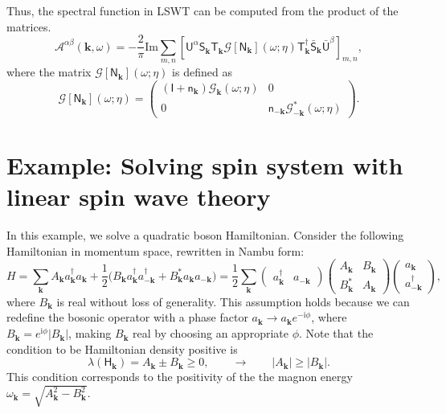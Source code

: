 \documentclass[aps, prx, nofootinbib, superscriptaddress]{revtex4-2}
\newcommand{\kvec}{\mathbf{k}}
\newcommand{\ri}{\mathrm{i}}
\begin{document}
Thus, the spectral function in LSWT can be computed from the product of the matrices.
\begin{equation}
    \mathcal{A}^{\alpha\beta}(\kvec, \omega) 
    = - \frac{2}{\pi} \mathrm{Im} 
    \sum_{m,n}
    \left[ 
    \mathsf{U}^{\alpha} \mathsf{S}_{\kvec}^{\phantom \dagger} \mathsf{T}_{\kvec}^{\phantom \dagger}
    \mathcal{G} [ \mathsf{N}_{\kvec} ] (\omega ; \eta)
    \mathsf{T}^{\dagger}_{\kvec} \bar{\mathsf{S}}_{\kvec}^{\phantom \dagger} \bar{\mathsf{U}}^{\beta}
    \right]_{m,n},
\end{equation}
where the matrix $\mathcal{G} [ \mathsf{N}_{\kvec} ] (\omega ; \eta)$ is defined as 
\begin{equation}
    \mathcal{G} [ \mathsf{N}_{\kvec} ] (\omega ; \eta)
    = 
    \begin{pmatrix}
        (\mathsf{I} + \mathsf{n}_{\kvec}) \mathcal{G}_{\kvec} (\omega; \eta) & 0 \\
        0 & \mathsf{n}_{-\kvec} \mathcal{G}_{-\kvec}^{*} (\omega; \eta)
    \end{pmatrix}.
\end{equation}






\section{Example: Solving spin system with linear spin wave theory}

In this example, we solve a quadratic boson Hamiltonian. Consider the following Hamiltonian in momentum space, rewritten in Nambu form:
\begin{equation}
    H = \sum_{\kvec} A_{\kvec} a^{\dagger}_{\kvec} a_{\kvec} + \frac{1}{2} \Big( B_{\kvec} a^{\dagger}_{\kvec} a^{\dagger}_{-\kvec} + B_{\kvec}^{*} a_{\kvec} a_{-\kvec} \Big) 
    = \frac{1}{2} \sum_{\kvec}
    \begin{pmatrix}
        a^{\dagger}_{\kvec} & a_{-\kvec}
    \end{pmatrix}
    \begin{pmatrix}
        A_{\kvec} & B_{\kvec} \\
        B_{\kvec}^{*} & A_{\kvec}
    \end{pmatrix}
    \begin{pmatrix}
        a_{\kvec} \\
        a^{\dagger}_{-\kvec}
    \end{pmatrix},
\end{equation}
where $ B_{\kvec} $ is real without loss of generality. This assumption holds because we can redefine the bosonic operator with a phase factor $ a_{\kvec} \to a_{\kvec} e^{-\ri\phi} $, where $ B_{\kvec} = e^{\ri\phi} |B_{\kvec}| $, making $ B_{\kvec} $ real by choosing an appropriate $ \phi $.
Note that the condition to be Hamiltonian density positive is 
\begin{equation*}
    \lambda(\mathsf{H}_{\kvec}) = A_{\kvec} \pm B_{\kvec} \ge 0, 
    \qquad \rightarrow \qquad
    | A_{\kvec} | \ge | B_{\kvec} |.
\end{equation*}
This condition corresponds to the positivity of the the magnon energy $\omega_{\kvec} = \sqrt{A_{\kvec}^{2} - B_{\kvec}^{2}}$.
\end{document}
